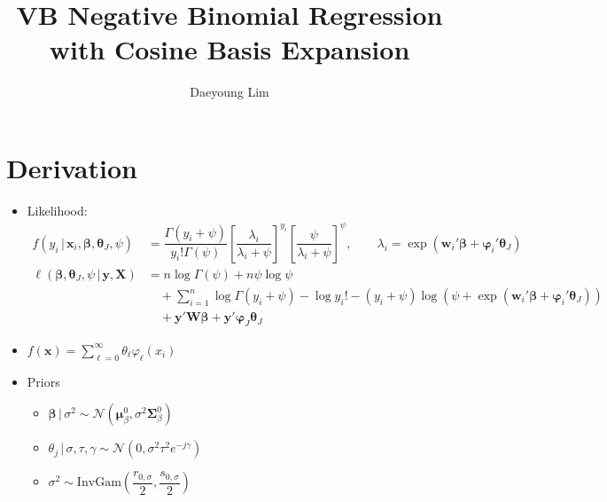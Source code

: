 \documentclass[review]{elsarticle}
\begin{document}
\begin{frontmatter}

\title{VB Negative Binomial Regression with Cosine Basis Expansion}
\author{Daeyoung Lim}


\end{frontmatter}

\linenumbers
\section{Derivation}
\begin{itemize}
  \item Likelihood:
  \begin{align}
    f\left(y_{i}\,|\,\mathbf{x}_{i},\bm{\beta},\bm{\theta}_{J},\psi\right) &= \dfrac{\Gamma\left(y_{i}+\psi\right)}{y_{i}!\Gamma\left(\psi\right)}\left[\dfrac{\lambda_{i}}{\lambda_{i}+\psi}\right]^{y_{i}}\left[\dfrac{\psi}{\lambda_{i}+\psi} \right]^{\psi},\qquad \lambda_{i}=\exp\left(\mathbf{w}_{i}'\bm{\beta}+\bm{\varphi}_{i}'\bm{\theta}_{J}^{}\right)\\
    \ell\left(\bm{\beta},\bm{\theta}_{J},\psi\,|\,\mathbf{y},\mathbf{X}\right) &= n\log\Gamma(\psi)+n\psi\log\psi\\
    &\quad +\sum_{i=1}^{n}\log\Gamma\left(y_{i}+\psi\right)-\log y_{i}!-\left(y_{i}+\psi\right)\log\left(\psi+\exp\left(\mathbf{w}_{i}'\bm{\beta}+\bm{\varphi}_{i}'\bm{\theta}_{J} \right)\right)\\
    &\quad +\mathbf{y}'\mathbf{W}\bm{\beta}+\mathbf{y}'\bm{\varphi}_{J}\bm{\theta}_{J}
  \end{align}
  \item $f(\mathbf{x})=\displaystyle\sum_{\ell=0}^{\infty}\theta_{\ell}\varphi_{\ell}\left(x_{i}\right)$
  \item Priors
  \begin{itemize}
    \item $\bm{\beta}\,|\,\sigma^{2} \sim \mathcal{N}\left(\bm{\mu}_{\beta}^{0},\sigma^{2}\bm{\Sigma}_{\beta}^{0}\right)$
    \item $\theta_{j}\,|\,\sigma,\tau,\gamma \sim \mathcal{N}\left(0,\sigma^{2}\tau^{2}e^{-j\gamma}\right)$
    \item $\sigma^{2} \sim \mathrm{InvGam}\left(\dfrac{r_{0,\sigma}}{2},\dfrac{s_{0,\sigma}}{2}\right)$

\end{itemize}
\end{itemize}
\end{document}
